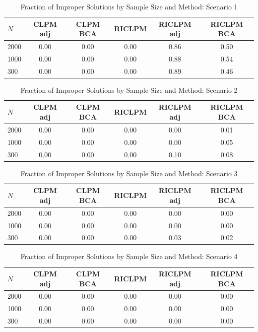 \begin{table}

\caption{\label{tab:improper-s1}Fraction of Improper Solutions by Sample Size and Method: Scenario 1}
\centering
\begin{tabular}[t]{lccccc}
\toprule
$N$ & CLPM adj & CLPM BCA & RICLPM & RICLPM adj & RICLPM BCA\\
\midrule
2000 & 0.00 & 0.00 & 0.00 & 0.86 & 0.50\\
1000 & 0.00 & 0.00 & 0.00 & 0.88 & 0.54\\
300 & 0.00 & 0.00 & 0.00 & 0.89 & 0.46\\
\bottomrule
\end{tabular}
\end{table}

\begin{table}

\caption{\label{tab:improper-s2}Fraction of Improper Solutions by Sample Size and Method: Scenario 2}
\centering
\begin{tabular}[t]{lccccc}
\toprule
$N$ & CLPM adj & CLPM BCA & RICLPM & RICLPM adj & RICLPM BCA\\
\midrule
2000 & 0.00 & 0.00 & 0.00 & 0.00 & 0.01\\
1000 & 0.00 & 0.00 & 0.00 & 0.00 & 0.05\\
300 & 0.00 & 0.00 & 0.00 & 0.10 & 0.08\\
\bottomrule
\end{tabular}
\end{table}

\begin{table}

\caption{\label{tab:improper-s3}Fraction of Improper Solutions by Sample Size and Method: Scenario 3}
\centering
\begin{tabular}[t]{lccccc}
\toprule
$N$ & CLPM adj & CLPM BCA & RICLPM & RICLPM adj & RICLPM BCA\\
\midrule
2000 & 0.00 & 0.00 & 0.00 & 0.00 & 0.00\\
1000 & 0.00 & 0.00 & 0.00 & 0.00 & 0.00\\
300 & 0.00 & 0.00 & 0.00 & 0.03 & 0.02\\
\bottomrule
\end{tabular}
\end{table}

\begin{table}

\caption{\label{tab:improper-s4}Fraction of Improper Solutions by Sample Size and Method: Scenario 4}
\centering
\begin{tabular}[t]{lccccc}
\toprule
$N$ & CLPM adj & CLPM BCA & RICLPM & RICLPM adj & RICLPM BCA\\
\midrule
2000 & 0.00 & 0.00 & 0.00 & 0.00 & 0.00\\
1000 & 0.00 & 0.00 & 0.00 & 0.00 & 0.00\\
300 & 0.00 & 0.00 & 0.00 & 0.00 & 0.00\\
\bottomrule
\end{tabular}
\end{table}
